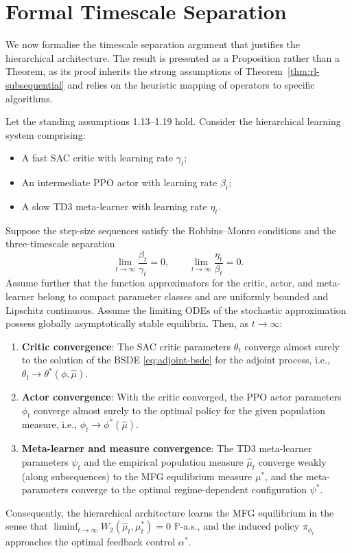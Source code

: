 \section{Formal Timescale Separation}
\label{sec:hrl-proposition}

We now formalise the timescale separation argument that justifies the hierarchical
architecture. The result is presented as a Proposition rather than a Theorem, as its
proof inherits the strong assumptions of Theorem~\ref{thm:rl-subsequential} and
relies on the heuristic mapping of operators to specific algorithms.

\begin{proposition}
\label{prop:timescale-separation}
Let the standing assumptions 1.13--1.19 hold. Consider the hierarchical learning
system comprising:
\begin{itemize}
    \item A fast SAC critic with learning rate $\gamma_t$;
    \item An intermediate PPO actor with learning rate $\beta_t$;
    \item A slow TD3 meta-learner with learning rate $\eta_t$.
\end{itemize}
Suppose the step-size sequences satisfy the Robbins--Monro conditions and the
three-timescale separation
\begin{equation}
    \lim_{t \to \infty} \frac{\beta_t}{\gamma_t} = 0, \qquad \lim_{t \to \infty}
    \frac{\eta_t}{\beta_t} = 0.
    \label{eq:hrl-timescale-separation}
\end{equation}
Assume further that the function approximators for the critic, actor, and
meta-learner belong to compact parameter classes and are uniformly bounded and
Lipschitz continuous. Assume the limiting ODEs of the stochastic approximation
possess globally asymptotically stable equilibria. Then, as $t \to \infty$:
\begin{enumerate}
    \item \textbf{Critic convergence}: The SAC critic parameters $\theta_t$ converge
    almost surely to the solution of the BSDE \eqref{eq:adjoint-bsde} for the adjoint
    process, i.e., $\theta_t \to \theta^*(\phi, \hat\mu)$.
    \item \textbf{Actor convergence}: With the critic converged, the PPO actor
    parameters $\phi_t$ converge almost surely to the optimal policy for the given
    population measure, i.e., $\phi_t \to \phi^*(\hat\mu)$.
    \item \textbf{Meta-learner and measure convergence}: The TD3 meta-learner
    parameters $\psi_t$ and the empirical population measure $\hat\mu_t$ converge
    weakly (along subsequences) to the MFG equilibrium measure $\mu^*$, and the
    meta-parameters converge to the optimal regime-dependent configuration $\psi^*$.
\end{enumerate}
Consequently, the hierarchical architecture learns the MFG equilibrium in the sense
that $\liminf_{t \to \infty} W_2(\hat\mu_t, \mu_t^*) = 0$ $\mathbb{P}$-a.s., and the
induced policy $\pi_{\phi_t}$ approaches the optimal feedback control $\alpha^*$.
\end{proposition}

